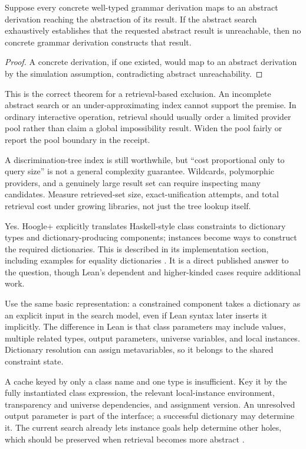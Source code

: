\begin{proposition}
Suppose every concrete well-typed grammar derivation maps to an abstract derivation reaching the abstraction of its result. If the abstract search exhaustively establishes that the requested abstract result is unreachable, then no concrete grammar derivation constructs that result.
\end{proposition}
\begin{proof}
A concrete derivation, if one existed, would map to an abstract derivation by the simulation assumption, contradicting abstract unreachability.
\end{proof}

This is the correct theorem for a retrieval-based exclusion. An incomplete abstract search or an under-approximating index cannot support the premise. In ordinary interactive operation, retrieval should usually order a limited provider pool rather than claim a global impossibility result. Widen the pool fairly or report the pool boundary in the receipt.

A discrimination-tree index is still worthwhile, but ``cost proportional only to query size'' is not a general complexity guarantee. Wildcards, polymorphic providers, and a genuinely large result set can require inspecting many candidates. Measure retrieved-set size, exact-unification attempts, and total retrieval cost under growing libraries, not just the tree lookup itself.

\ans Yes. Hoogle+ explicitly translates Haskell-style class constraints to dictionary types and dictionary-producing components; instances become ways to construct the required dictionaries. This is described in its implementation section, including examples for equality dictionaries \cite{hoogleplus}. It is a direct published answer to the question, though Lean's dependent and higher-kinded cases require additional work.

Use the same basic representation: a constrained component takes a dictionary as an explicit input in the search model, even if Lean syntax later inserts it implicitly. The difference in Lean is that class parameters may include values, multiple related types, output parameters, universe variables, and local instances. Dictionary resolution can assign metavariables, so it belongs to the shared constraint state.

A cache keyed by only a class name and one type is insufficient. Key it by the fully instantiated class expression, the relevant local-instance environment, transparency and universe dependencies, and assignment version. An unresolved output parameter is part of the interface; a successful dictionary may determine it. The current search already lets instance goals help determine other holes, which should be preserved when retrieval becomes more abstract \cite{searchcore}.

